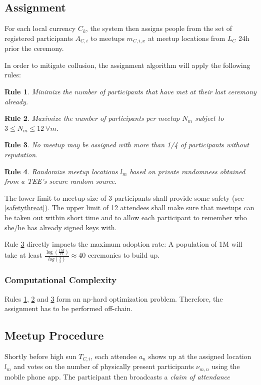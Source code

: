 \documentclass[conference]{IEEEtran}
\newtheorem{erule}{Rule}
\begin{document}
\subsection{Assignment}

For each local currency $C_k$, the system then assigns people from the set of registered participants $A_{C,i}$ to meetups $m_{C,i,x}$ at meetup locations from $L_C$ 24h prior the ceremony. 

In order to mitigate collusion, the assignment algorithm will apply the following rules: 

\begin{erule}\label{rule:notseeagain}
Minimize the number of participants that have met at their last ceremony already.
\end{erule}

\begin{erule}\label{rule:meetupsize}
Maximize the number of participants per meetup $N_m$ subject to $3 \leq N_m \leq 12\  \forall m$. 
\end{erule}

\begin{erule}\label{rule:noreplimit}
No meetup may be assigned with more than 1/4 of participants without reputation.
\end{erule}
	
\begin{erule}
Randomize meetup locations $l_m$ based on private randomness obtained from a TEE's secure random source.
\end{erule}

The lower limit to meetup size of 3 participants shall provide some safety (see \ref{safetythreat}). 
The upper limit of 12 attendees shall make sure that meetups can be taken out within short time and to allow each participant to remember who she/he has already signed keys with.

Rule \ref{rule:noreplimit} directly impacts the maximum adoption rate: A population of 1M will take at least $\frac{\log(\frac{1M}{12})}{log(\frac{4}{3})} \approx 40$ ceremonies to build up.

\subsubsection{Computational Complexity}
Rules \ref{rule:notseeagain}, \ref{rule:meetupsize} and \ref{rule:noreplimit} form an np-hard optimization problem. Therefore, the assignment has to be performed off-chain.

\subsection{Meetup Procedure}
Shortly before high sun $T_{C,i}$, each attendee $a_n$ shows up at the assigned location $l_m$ and votes on the number of physically present participants $\nu_{m,n}$ using the \encointer mobile phone app. The participant then broadcasts a \emph{claim of attendance} 
\end{document}
